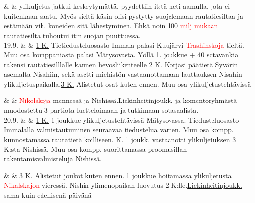 \documentclass[11pt,a5paper,oneside]{book}
\begin{document}
\newpage

& & ylikuljetus jatkui keskeytymättä. pyydettiin it:tä heti aamulla, jota ei kuitenkaan saatu. Myös sieltä käsin olisi pystytty suojelemaan rautatiesiltaa ja estämään vih. koneiden sitä lähestyminen. Ehkä noin 100 \textcolor{red}{milj mukaan} rautatiesilta tuhoutui it:n suojan puuttuessa. \newline\newline\newline \\

19.9. & & \underline{1 K.} Tietiedusteluosasto Immala palasi Kuujärvi-\textcolor{red}{Trashinskoja} tieltä. Muu osa komppaniasta palasi Mätysovasta. Yöllä 1. joukkue + 40 sotavankia rakensi rautatiesilllalle kannen hevosliikenteelle \newline \underline{2 K.} Korjasi päätietä Syvärin asemalta-Nisahiin, sekä asetti miehistön vastaanottamaan lauttauksen Nisahin ylikuljetuspaikalla.\newline\newline \underline{3 K.} Alistetut osat kuten ennen. Muu osa ylikuljetustehtävissä \\

\taulustop


& & \textcolor{red}{Nikolskoja} mennessä ja Nishissä.\newline\newline Liekinheitinjoukk. ja komentoryhmästä muodostettu 3 partiota luetteloimaan ja tutkimaan sotasaalista.\newline\newline\newline\newline \\

20.9. & & \underline{1 K.} 1 joukkue ylikuljetustehtävissä Mätysovassa. Tiedusteluosasto Immalalla valmistautuminen seuraavaa tiedustelua varten. Muu osa kompp. kunnostamassa rautatietä koilliseen.\newline{} K. 1 joukk. vastaanotti ylikuljetuksen 3 K:sta Nishissä. Muu osa kompp. suorittamassa proomusillan rakentamisvalmisteluja Nishissä. \\

\newpage

& & \underline{3 K.} Alistetut joukot kuten ennen. 1 joukkue hoitamassa ylikuljetusta \textcolor{red}{Nikalskajon} vieressä. Nishin ylimenopaikan luovutus 2 K:lle.\newline\newline \underline{Liekinheitinjoukk.} sama kuin edellisenä päivänä \newline\newline \\
\end{document}
